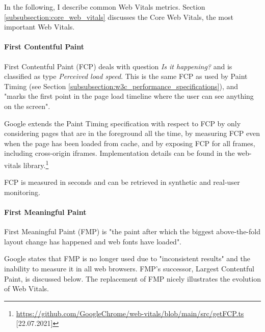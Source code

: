 

In the following, I describe common Web Vitals metrics.
Section \ref{subsubsection:core_web_vitals} discusses the Core Web Vitals, the most important Web Vitals.


\paragraph{First Contentful Paint} %

First Contentful Paint (FCP) deals with question \textit{Is it happening?} and is classified as type \textit{Perceived load speed}.
This is the same FCP as used by Paint Timing (see Section \ref{subsubsection:w3c_performance_specifications}), and "marks the first point in the page load timeline where the user can see anything on the screen". %

Google extends the Paint Timing specification with respect to FCP by only considering pages that are in the foreground all the time, by measuring FCP even when the page has been loaded from cache, and by exposing FCP for all frames, including cross-origin iframes.
Implementation details can be found in the web-vitals library.\footnote{\url{https://github.com/GoogleChrome/web-vitals/blob/main/src/getFCP.ts} [22.07.2021]}

FCP is measured in seconds and can be retrieved in synthetic and real-user monitoring.


\paragraph{First Meaningful Paint} %

First Meaningful Paint (FMP) is "the paint after which the biggest above-the-fold layout change has happened and web fonts have loaded". %

Google states that FMP is no longer used due to "inconsistent results" and the inability to measure it in all web browsers. %
FMP's successor, Largest Contentful Paint, is discussed below.
The replacement of FMP nicely illustrates the evolution of Web Vitals.



